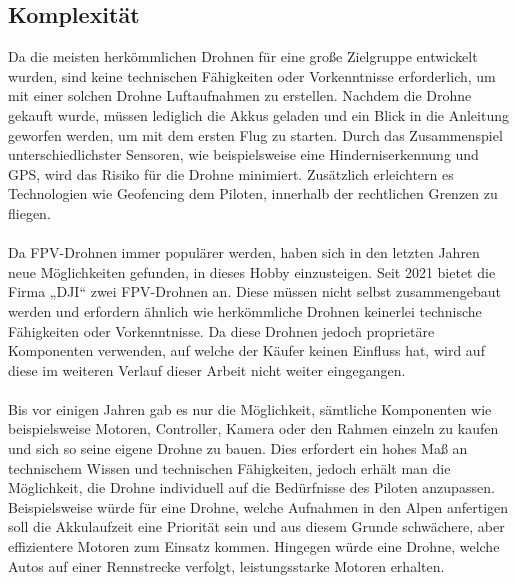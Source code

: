     \subsection[Komplexität]{Komplexität}
        Da die meisten herkömmlichen Drohnen für eine große Zielgruppe entwickelt wurden, sind keine technischen Fähigkeiten oder Vorkenntnisse erforderlich, um mit einer solchen Drohne Luftaufnahmen zu erstellen. Nachdem die Drohne gekauft wurde, müssen lediglich die Akkus geladen und ein Blick in die Anleitung geworfen werden, um mit dem ersten Flug zu starten. Durch das Zusammenspiel unterschiedlichster Sensoren, wie beispielsweise eine Hinderniserkennung und GPS, wird das Risiko für die Drohne minimiert. Zusätzlich erleichtern es Technologien wie Geofencing dem Piloten, innerhalb der rechtlichen Grenzen zu fliegen.
        \\ \\
        Da FPV-Drohnen immer populärer werden, haben sich in den letzten Jahren neue Möglichkeiten gefunden, in dieses Hobby einzusteigen. Seit 2021 bietet die Firma „DJI“ zwei FPV-Drohnen an. Diese müssen nicht selbst zusammengebaut werden und erfordern ähnlich wie herkömmliche Drohnen keinerlei technische Fähigkeiten oder Vorkenntnisse. Da diese Drohnen jedoch proprietäre Komponenten verwenden, auf welche der Käufer keinen Einfluss hat, wird auf diese im weiteren Verlauf dieser Arbeit nicht weiter eingegangen.
        \\ \\
        Bis vor einigen Jahren gab es nur die Möglichkeit, sämtliche Komponenten wie beispielsweise Motoren, Controller, Kamera oder den Rahmen einzeln zu kaufen und sich so seine eigene Drohne zu bauen. Dies erfordert ein hohes Maß an technischem Wissen und technischen Fähigkeiten, jedoch erhält man die Möglichkeit, die Drohne individuell auf die Bedürfnisse des Piloten anzupassen. Beispielsweise würde für eine Drohne, welche Aufnahmen in den Alpen anfertigen soll die Akkulaufzeit eine Priorität sein und aus diesem Grunde schwächere, aber effizientere Motoren zum Einsatz kommen. Hingegen würde eine Drohne, welche Autos auf einer Rennstrecke verfolgt, leistungsstarke Motoren erhalten.